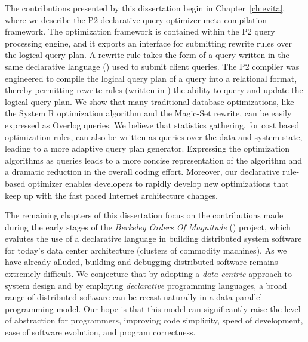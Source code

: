 The contributions presented by this dissertation begin in Chapter~\ref{ch:evita}, where we describe the P2 declarative 
query optimizer meta-compilation framework. The optimization framework is contained within the P2 query processing engine, 
and it exports an interface for submitting rewrite rules over the logical query plan. A rewrite rule takes the form of a query written 
in the same declarative language (\OVERLOG) used to submit 
client queries. The P2 compiler was engineered to compile the logical query plan of a query into a relational format, thereby permitting 
rewrite rules (written in \OVERLOG) the ability to query and update the logical query plan.  We show that 
many traditional database optimizations, like the System R optimization algorithm and the Magic-Set rewrite, can be easily expressed 
as Overlog queries.  We believe that statistics gathering, for cost based optimization rules, can also be written as \OVERLOG queries over 
the data and system state, leading to a more adaptive query plan generator. Expressing the optimization algorithms as \OVERLOG queries 
leads to a more concise representation of the algorithm and a dramatic reduction in the overall coding effort. Moreover, our declarative
rule-based optimizer enables developers to rapidly develop new optimizations that keep up with the fast paced Internet architecture
changes.
 
The remaining chapters of this dissertation focus on the contributions made during the early stages 
of the {\em Berkeley Orders Of Magnitude} (\BOOM) project, which evalutes the use of a declarative 
language in building distributed system software for today's data center architecture (clusters of commodity 
machines). As we have already alluded, building and debugging distributed software remains extremely 
difficult. We conjecture that by adopting a \emph{data-centric} approach to 
system design and by employing \emph{declarative} programming languages, a broad range of distributed software 
can be recast naturally in a data-parallel programming model.  Our hope is that this model can significantly raise the level of abstraction 
for programmers, improving code simplicity, speed of development, ease of software evolution, and program correctness.

